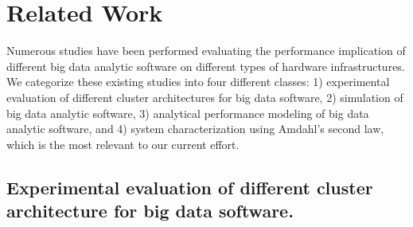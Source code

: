 \documentclass[journal]{IEEEtran}
\begin{document}
\section{Related Work} \label{sec:RelatedWork}
Numerous studies have been performed evaluating the performance implication of different big data analytic software on different types of hardware infrastructures. We categorize these existing studies into four different classes: 1) experimental evaluation of different cluster architectures for big data software, 2) simulation of big data analytic software, 3) analytical performance modeling of big data analytic software, and 4) system characterization using Amdahl's second law, which is the most relevant to our current effort. %

\subsection{Experimental evaluation of different cluster architecture for big data software.}  %
\end{document}
